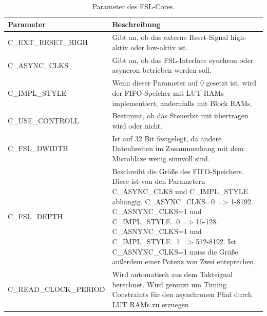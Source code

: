 \begin{table}[ht!]
	\begin{tabular}{|l|p{10cm}|}
		\hline \textbf{Parameter} & \textbf{Beschreibung} \\ 
		\hline C\_EXT\_RESET\_HIGH & Gibt an, ob das externe Reset-Signal high-aktiv oder low-aktiv ist.\\ 
		\hline C\_ASYNC\_CLKS & Gibt an, ob das FSL-Interface synchron oder asyncron betrieben werden soll.\\ 
		\hline C\_IMPL\_STYLE & Wenn dieser Parameter auf 0 gesetzt ist, wird der FIFO-Speicher mit LUT RAMs implementiert, andernfalls mit Block RAMs.   \\ 
		\hline C\_USE\_CONTROLL & Bestimmt, ob das Steuerbit mit übertragen wird oder nicht.\\ 
		\hline C\_FSL\_DWIDTH & Ist auf 32 Bit festgelegt, da andere Datenbreiten im Zusammenhang mit dem Microblaze wenig sinnvoll sind. \\ 
		\hline C\_FSL\_DEPTH & Beschreibt die Größe des FIFO-Speichers. Diese ist von den Parametern C\_ASYNC\_CLKS und C\_IMPL\_STYLE abhängig. C\_ASYNC\_CLKS=0 => 1-8192. C\_ASNYNC\_CLKS=1 und C\_IMPL\_STYLE=0 => 16-128. C\_ASNYNC\_CLKS=1 und C\_IMPL\_STYLE=1 => 512-8192. Ist C\_ASNYNC\_CLKS=1 muss die Größe außerdem einer Potenz von Zwei entsprechen.\\ 
		\hline C\_READ\_CLOCK\_PERIOD & Wird automatisch aus dem Taktsignal berechnet. Wird genutzt um Timing Constraints für den asynchronen Pfad durch LUT RAMs zu erzuegen \\
		\hline 
	\end{tabular}
	\centering
	\caption{Parameter des FSL-Cores.}
	\label{tab:FSLParam}
\end{table}

